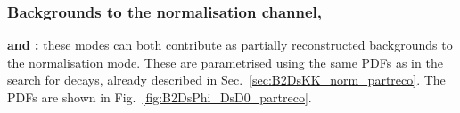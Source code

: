 \subsubsection{Backgrounds to the normalisation channel, \decay{\Bp}{\Dsp\Dzb}}

 \begin{description}
\item \textbf{\decay{\Bp}{(\decay{\Dssp}{\Dsp[\piz/\Pgamma]})\Dzb} and \decay{\Bp}{\Dsp(\decay{\Dstarzb}{\Dzb[\piz/\Pgamma]})}:}
these modes can both contribute as partially reconstructed backgrounds to the \decay{\Bp}{\Dsp\Dzb} normalisation mode. These are parametrised using the same PDFs as in the search for \decay{\Bp}{\Dsp\Kp\Km} decays, already described in Sec.~\ref{sec:B2DsKK_norm_partreco}. The PDFs are shown in Fig.~\ref{fig:B2DsPhi_DsD0_partreco}.
\end{description}



